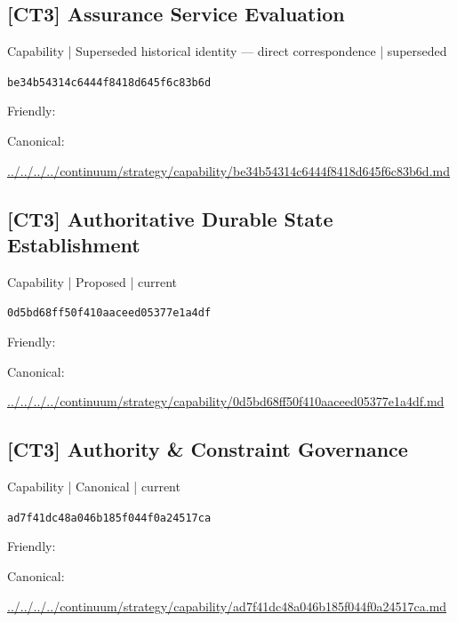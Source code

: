 \documentclass[10pt,a4paper]{article}
\begin{document}
\subsection*{[CT3] Assurance Service Evaluation}
{\small Capability | Superseded historical identity — direct correspondence | superseded}\par
\texttt{be34b54314c6444f8418d645f6c83b6d}\par
Friendly: \par
Canonical: \par
{\footnotesize\url{../../../../continuum/strategy/capability/be34b54314c6444f8418d645f6c83b6d.md}}\par
\subsection*{[CT3] Authoritative Durable State Establishment}
{\small Capability | Proposed | current}\par
\texttt{0d5bd68ff50f410aaceed05377e1a4df}\par
Friendly: \par
Canonical: \par
{\footnotesize\url{../../../../continuum/strategy/capability/0d5bd68ff50f410aaceed05377e1a4df.md}}\par
\subsection*{[CT3] Authority \& Constraint Governance}
{\small Capability | Canonical | current}\par
\texttt{ad7f41dc48a046b185f044f0a24517ca}\par
Friendly: \par
Canonical: \par
{\footnotesize\url{../../../../continuum/strategy/capability/ad7f41dc48a046b185f044f0a24517ca.md}}\par
\end{document}
